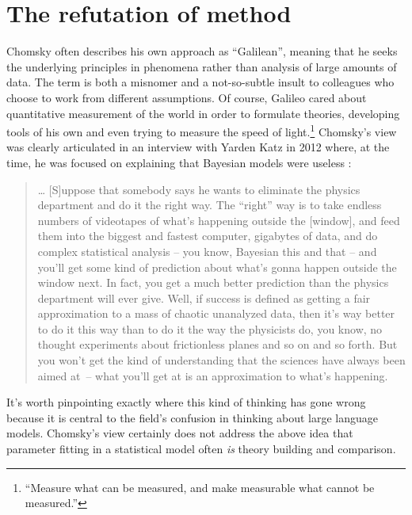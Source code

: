 \documentclass[output=paper,colorlinks,citecolor=brown]{langscibook}
\begin{document}
\section{The refutation of method}

Chomsky often describes his own approach as ``Galilean'', meaning that he seeks the underlying principles in phenomena rather than analysis of large amounts of data. The term is both a misnomer \citep{behme2014galilean} and a not-so-subtle insult to colleagues who choose to work from different assumptions. Of course,  Galileo cared about quantitative measurement of the world in order to formulate theories, developing tools of his own and even trying to measure the speed of light.\footnote{``Measure what can be measured, and make measurable what cannot be measured.''} Chomsky's view was clearly articulated in an interview with Yarden Katz in 2012 where, at the time, he was focused on explaining that Bayesian models were useless \citep{katz2012noam}: 
\begin{quote}
 \ldots{}  [S]uppose that somebody says he wants to eliminate the physics department and do it the right way. The ``right'' way is to take endless numbers of videotapes of what's happening outside the [window], and feed them into the biggest and fastest computer, gigabytes of data, and do complex statistical analysis -- you know, Bayesian this and that -- and you'll get some kind of prediction about what's gonna happen outside the window next. In fact, you get a much better prediction than the physics department will ever give. Well, if success is defined as getting a fair approximation to a mass of chaotic unanalyzed data, then it's way better to do it this way than to do it the way the physicists do, you know, no thought experiments about frictionless planes and so on and so forth. But you won't get the kind of understanding that the sciences have always been aimed at~– what you'll get at is an approximation to what's happening.
\end{quote}
It's worth pinpointing exactly where this kind of thinking has gone wrong because it is central to the field's confusion in thinking about large language models. Chomsky's view certainly does not address the above idea that parameter fitting in a statistical model often \textit{is} theory building and comparison. 
\end{document}
